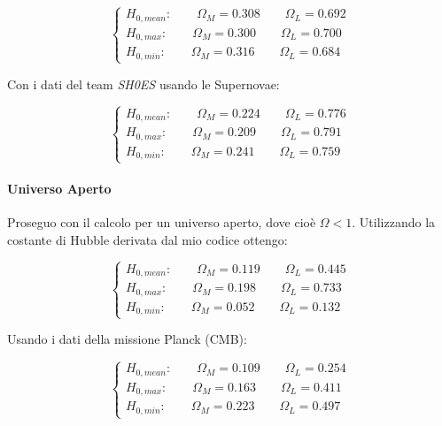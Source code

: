 \documentclass{article}
\begin{document}
  \begin{equation}
  \begin{cases}
    H_{0,mean} : \qquad \Omega_M = 0.308 \qquad \Omega_L = 0.692 \\
    H_{0,max} : \qquad \Omega_M = 0.300 \qquad \Omega_L = 0.700 \\
    H_{0,min} : \qquad \Omega_M = 0.316 \qquad \Omega_L = 0.684
  \end{cases}
\end{equation}

Con i dati del team \emph{SH0ES} usando le Supernovae:

\begin{equation}
  \begin{cases}
    H_{0,mean} : \qquad \Omega_M = 0.224 \qquad \Omega_L = 0.776\\
    H_{0,max} : \qquad \Omega_M = 0.209 \qquad \Omega_L = 0.791 \\
    H_{0,min} : \qquad \Omega_M = 0.241 \qquad \Omega_L = 0.759
  \end{cases}
\end{equation}

\paragraph{Universo Aperto}

Proseguo con il calcolo per un universo aperto, dove cioè $\Omega <
1$. Utilizzando la costante di Hubble derivata dal mio codice ottengo:

\begin{equation}
  \begin{cases}
    H_{0,mean} : \qquad \Omega_M = 0.119 \qquad \Omega_L = 0.445 \\
    H_{0,max} : \qquad \Omega_M = 0.198 \qquad \Omega_L = 0.733 \\
    H_{0,min} : \qquad \Omega_M = 0.052 \qquad \Omega_L = 0.132
  \end{cases}
\end{equation}

Usando i dati della missione Planck (CMB):

\begin{equation}
  \begin{cases}
    H_{0,mean} : \qquad \Omega_M = 0.109 \qquad \Omega_L = 0.254 \\
    H_{0,max} : \qquad \Omega_M = 0.163 \qquad \Omega_L = 0.411 \\
    H_{0,min} : \qquad \Omega_M = 0.223 \qquad \Omega_L = 0.497
  \end{cases}
\end{equation}
\end{document}
